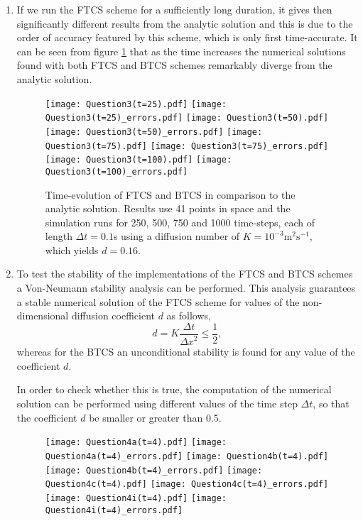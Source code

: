 \documentclass[12pt]{article}
\begin{document}
\begin{enumerate}
\item If we run the FTCS scheme for a sufficiently long duration, it gives then significantly different results from the analytic solution and this is due to the order of accuracy featured by this scheme, which is only first time-accurate. It can be seen from figure \ref{fig:Q3} that as the time increases the numerical solutions found with both FTCS and BTCS schemes remarkably diverge from the analytic solution.

\begin{figure}[!tbh]
\centering
\texttt{[image: Question3(t=25).pdf]}
\texttt{[image: Question3(t=25)\_errors.pdf]}
\texttt{[image: Question3(t=50).pdf]}
\texttt{[image: Question3(t=50)\_errors.pdf]}
\texttt{[image: Question3(t=75).pdf]}
\texttt{[image: Question3(t=75)\_errors.pdf]}
\texttt{[image: Question3(t=100).pdf]}
\texttt{[image: Question3(t=100)\_errors.pdf]}

\caption{Time-evolution of FTCS and BTCS in comparison to the analytic solution. Results
use 41 points in space and the simulation runs for 250, 500, 750 and 1000 time-steps,
each of length $\Delta t=0.1$s using a diffusion number of $K=10^{-3}\text{m}^{2}\text{s}^{-1}$, which yields $d=0.16$.
\label{fig:Q3}}
\end{figure}

\item To test the stability of the implementations of the FTCS and BTCS schemes a Von-Neumann stability analysis can be performed. This analysis guarantees a stable numerical solution of the FTCS scheme for values of the non-dimensional diffusion coefficient $d$ as follows,
\begin{equation}
d=K\frac{\Delta t}{{\Delta x}^2} \leq \frac{1}{2},
\end{equation}
whereas for the BTCS an unconditional stability is found for any value of the coefficient $d$.\par
In order to check whether this is true, the computation of the numerical solution can be performed using different values of the time step $\Delta t$, so that the coefficient $d$ be smaller or greater than 0.5.

\begin{figure}[!tbh]
\centering
\texttt{[image: Question4a(t=4).pdf]}
\texttt{[image: Question4a(t=4)\_errors.pdf]}
\texttt{[image: Question4b(t=4).pdf]}
\texttt{[image: Question4b(t=4)\_errors.pdf]}
\texttt{[image: Question4c(t=4).pdf]}
\texttt{[image: Question4c(t=4)\_errors.pdf]}
\texttt{[image: Question4i(t=4).pdf]}
\texttt{[image: Question4i(t=4)\_errors.pdf]}


\end{figure}
\end{enumerate}
\end{document}

